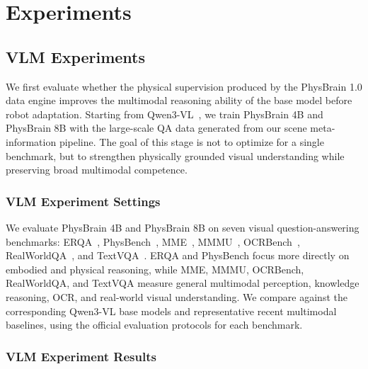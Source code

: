 \documentclass{llmxive}
\providecommand{\todo}[1]{}
\begin{document}
\section{Experiments}
\label{sec:experiments}



\subsection{VLM Experiments}
\label{subsec:vlm_exp}

We first evaluate whether the physical supervision produced by the PhysBrain 1.0 data engine improves the multimodal reasoning ability of the base model before robot adaptation. Starting from Qwen3-VL~\cite{Qwen3-VL_2025_arXiv}, we train PhysBrain 4B and PhysBrain 8B with the large-scale QA data generated from our scene meta-information pipeline. The goal of this stage is not to optimize for a single benchmark, but to strengthen physically grounded visual understanding while preserving broad multimodal competence.

\subsubsection{VLM Experiment Settings}

We evaluate PhysBrain 4B and PhysBrain 8B on seven visual question-answering benchmarks: ERQA~\citep{GoogleRobotics_2025_arxiv}, PhysBench~\citep{PhysBench_2025_arXiv}, MME~\cite{MME_2023_arXiv}, MMMU~\citep{MMMU_2024_CVPR}, OCRBench~\citep{OCRBenchV2_2025_arXiv}, RealWorldQA~\citep{OCRBenchV2_2025_arXiv}, and TextVQA~\citep{TextVQA_2019_CVPR}. ERQA and PhysBench focus more directly on embodied and physical reasoning, while MME, MMMU, OCRBench, RealWorldQA, and TextVQA measure general multimodal perception, knowledge reasoning, OCR, and real-world visual understanding. We compare against the corresponding Qwen3-VL base models and representative recent multimodal baselines, using the official evaluation protocols for each benchmark.

\subsubsection{VLM Experiment Results}
\end{document}
